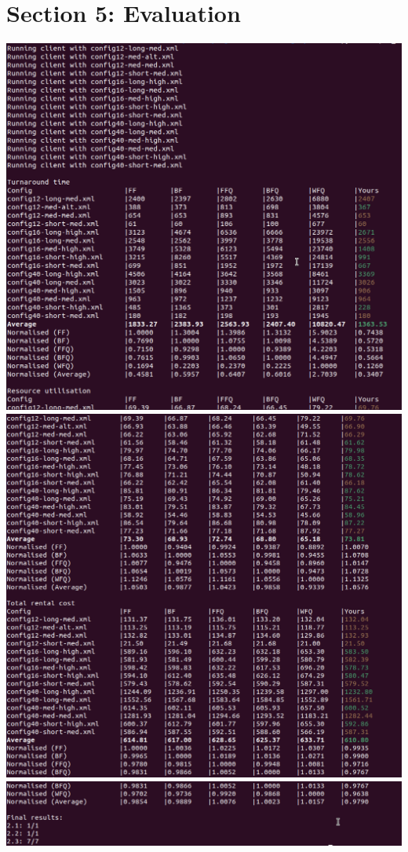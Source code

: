 \documentclass[a4paper]{article} %
\begin{document}
\section*{Section 5: Evaluation}\label{sec:section5}

\includegraphics*[scale=0.5]{1.png}\\
\includegraphics*[scale=0.5]{2.png}\\
\includegraphics*[scale=0.5]{3.png}
\end{document}
